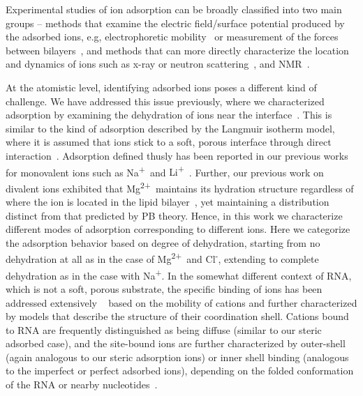 \documentclass[journal=langd5,manuscript=article]{achemso}
\newcommand{\na}{Na\textsuperscript{+}~}
\newcommand{\li}{Li\textsuperscript{+}~}
\newcommand{\mg}{Mg\textsuperscript{2+}~}
\begin{document}
Experimental studies of ion adsorption can be broadly
classified into two main groups -- methods that examine the electric field/surface potential
produced by the adsorbed ions, e.g, electrophoretic mobility~\cite{smith:2017:zeta} or 
measurement of the forces between 
bilayers~\cite{marra:1985:direct}, and methods
that can more directly characterize the location and dynamics of ions such 
as x-ray or neutron 
scattering~\cite{fogarty:2015,nagle:2000,pan:2012,panff:2012,uhrikova:2008,mason:2006:neutron}, and
NMR~\cite{nagle:2000,venable:2013,casal:1989}. 

At the atomistic level, identifying adsorbed ions poses a different kind of challenge.
We have addressed this issue previously,
where we characterized adsorption by examining the dehydration of ions near the
interface~\cite{kruczek:2019,kruczek:2017,pandit:2003:dppc:na,Berkowitz:2006}.
This is similar to the kind of adsorption described 
by the Langmuir isotherm model, where it is
assumed that ions stick to a soft, porous interface 
through direct interaction~\cite{kalinin:1996:ionbinding}.
Adsorption defined thusly has been reported in our previous works for monovalent ions 
such as \na and {\li}\cite{kruczek:2017,kruczek:2019,saunders:2019,saunders:2022}.
Further, our previous work on divalent ions
exhibited that \mg maintains its 
hydration {structure} regardless of where the ion is located in the 
lipid bilayer~\cite{kruczek:2019}, yet maintaining 
a distribution distinct from that
predicted by PB theory. Hence, {in this work
    we characterize different modes of adsorption corresponding
to different ions. Here we} categorize the 
adsorption behavior based on degree of 
dehydration, starting from no
dehydration at all as in the case of \mg and Cl\textsuperscript{-}, 
extending to complete dehydration as in the case with Na\textsuperscript{+}. 
In {the somewhat different} 
context of RNA, which is not a soft, 
porous substrate, the specific binding of ions has been addressed
extensively
~\cite{bowman:2012,rulivsek:2003:outer,dudev:2003,porschke:1979:mode,petrov:2005}
based on the mobility of cations and further 
characterized by models that describe the 
structure of their coordination shell.
Cations bound to RNA are frequently distinguished as
being diffuse {(similar to our steric adsorbed case)}, and the site-bound ions are further characterized
by outer-shell {(again analogous to our steric adsorption ions)} 
or inner shell binding 
{(analogous to the imperfect or perfect adsorbed ions)}, depending on
the folded conformation of the RNA or 
nearby nucleotides~\cite{bowman:2012,rulivsek:2003:outer,dudev:2003,porschke:1979:mode,petrov:2005}. 
\end{document}
